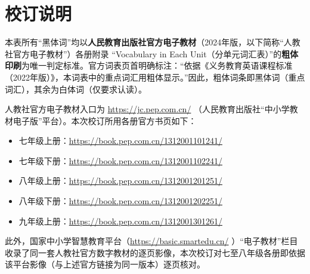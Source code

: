 \documentclass[UTF8,a4paper,11pt,oneside]{ctexbook}
\begin{document}
\chapter*{校订说明}
{}
\vspace{-0.2em}
\noindent{\color{mainblue!35}\rule{\linewidth}{1.0pt}}\par
\vspace{0.7em}

\par\addvspace{0.75em}\par
\vspace{0.12em}\noindent{\color{rulelight}\rule{\linewidth}{0.55pt}}\par
\addvspace{0.2em}
本表所有“黑体词”均以\textbf{\textcolor{mainblue}{人民教育出版社官方电子教材}}（2024年版，以下简称“人教社官方电子教材”）各册附录 “Vocabulary in Each Unit（分单元词汇表）”的\textbf{\textcolor{mainblue}{粗体印刷}}为唯一判定标准。官方词表页首明确标注：“依据《义务教育英语课程标准（2022年版）》，本词表中的重点词汇用粗体显示。”因此，粗体词条即黑体词（重点词汇），其余为白体词（仅要求认读）。\par
人教社官方电子教材入口为 \url{https://jc.pep.com.cn/} （人民教育出版社“中小学教材电子版”平台）。本次校订所用各册官方书页如下：\par
\begin{itemize}[leftmargin=2.2em,itemsep=0.25ex,topsep=0.3ex,label={\textcolor{mainblue}{\small\textbullet}}]
\item 七年级上册：\url{https://book.pep.com.cn/1312001101241/}
\item 七年级下册：\url{https://book.pep.com.cn/1312001102241/}
\item 八年级上册：\url{https://book.pep.com.cn/1312001201251/}
\item 八年级下册：\url{https://book.pep.com.cn/1312001202251/}
\item 九年级上册：\url{https://book.pep.com.cn/1312001301261/}
\end{itemize}
此外，国家中小学智慧教育平台（\url{https://basic.smartedu.cn/} ）“电子教材”栏目收录了同一套人教社官方数字教材的逐页影像，本次校订对七至八年级各册即依据该平台影像（与上述官方链接为同一版本）逐页核对。\par
\par\addvspace{0.75em}\par
\end{document}
